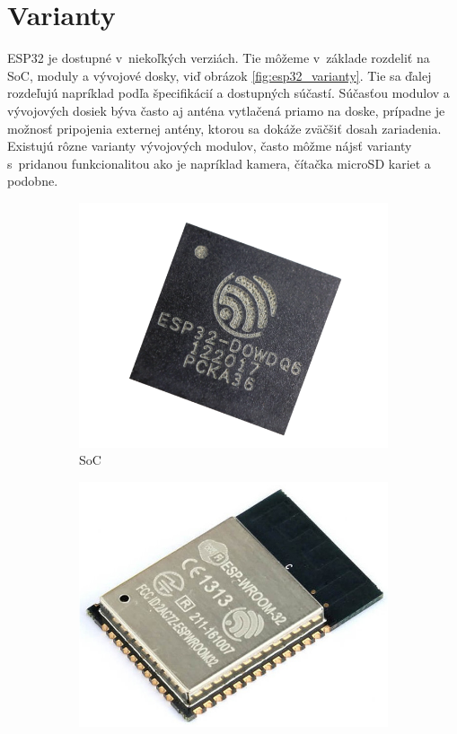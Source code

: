 \section{Varianty}

ESP32 je dostupné v~niekoľkých verziách. Tie môžeme v~základe rozdeliť na SoC, moduly a vývojové dosky, viď obrázok \ref{fig:esp32_varianty}. Tie sa ďalej rozdeľujú napríklad podľa špecifikácií a dostupných súčastí. Súčasťou  modulov a vývojových dosiek býva často aj anténa vytlačená priamo na doske, prípadne je možnosť pripojenia externej antény, ktorou sa dokáže zväčšiť dosah zariadenia. Existujú rôzne varianty vývojových modulov, často môžme nájsť varianty s~pridanou funkcionalitou ako je napríklad kamera, čítačka microSD kariet a podobne.

\begin{figure}[ht]
    \centering
    \begin{subfigure}{.3\textwidth}
      \centering
      \includegraphics[width=.8\linewidth]{obrazky-figures/esp-soc.png}  
      \caption{SoC\footnotemark[2]}
      \label{fig:esp32_soc}
    \end{subfigure}
    \begin{subfigure}{.3\textwidth}
      \centering
      \includegraphics[width=.8\linewidth]{obrazky-figures/esp-module.jpg}  

\end{subfigure}
\end{figure}
